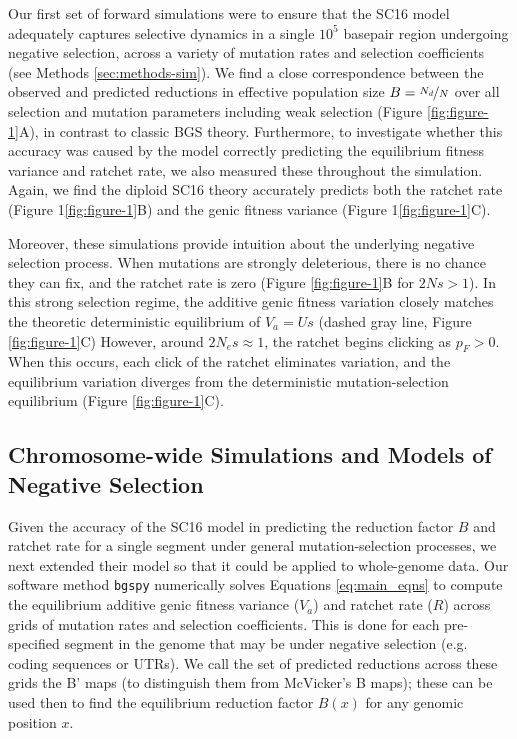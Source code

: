 \documentclass[11pt]{article}
\begin{document}
Our first set of forward simulations were to ensure that the SC16 model
adequately captures selective dynamics in a single $10^5$ basepair region
undergoing negative selection, across a variety of mutation rates and selection
coefficients (see Methods \ref{sec:methods-sim}). We find a close
correspondence between the observed and predicted reductions in effective
population size $B=\nicefrac{N_d}{N}$ over all selection and mutation
parameters including weak selection (Figure \ref{fig:figure-1}A), in contrast
to classic BGS theory. Furthermore, to investigate whether this accuracy was
caused by the model correctly predicting the equilibrium fitness variance and
ratchet rate, we also measured these throughout the simulation. Again, we find
the diploid SC16 theory accurately predicts both the ratchet rate (Figure
1\ref{fig:figure-1}B) and the genic fitness variance (Figure
1\ref{fig:figure-1}C).

Moreover, these simulations provide intuition about the underlying negative
selection process. When mutations are strongly deleterious, there is no chance
they can fix, and the ratchet rate is zero (Figure \ref{fig:figure-1}B for $2Ns
> 1$). In this strong selection regime, the additive genic fitness variation
closely matches the theoretic deterministic equilibrium of $V_a = Us$ (dashed
gray line, Figure \ref{fig:figure-1}C) However, around $2N_e s \approx 1$, the
ratchet begins clicking as $p_F > 0$. When this occurs, each click of the
ratchet eliminates variation, and the equilibrium variation diverges from the
deterministic mutation-selection equilibrium (Figure \ref{fig:figure-1}C).

\subsection*{Chromosome-wide Simulations and Models of Negative Selection}
\label{sec:chrom-sims}

Given the accuracy of the SC16 model in predicting the reduction factor $B$ and
ratchet rate for a single segment under general mutation-selection processes,
we next extended their model so that it could be applied to whole-genome data.
Our software method \texttt{bgspy} numerically solves Equations
\eqref{eq:main_eqns} to compute the equilibrium additive genic fitness variance
($V_a$) and ratchet rate ($R$) across grids of mutation rates and selection
coefficients. This is done for each pre-specified segment in the genome that
may be under negative selection (e.g. coding sequences or UTRs). We call the
set of predicted reductions across these grids the B' maps (to distinguish them
from McVicker's B maps); these can be used then to find the equilibrium
reduction factor $B(x)$ for any genomic position $x$.
\end{document}
